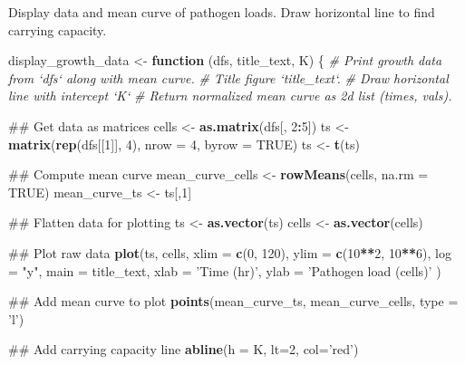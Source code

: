 \documentclass[]{article}
\newenvironment{Shaded}{\begin{snugshade}}{\end{snugshade}}
\newcommand{\KeywordTok}[1]{\textcolor[rgb]{0.13,0.29,0.53}{\textbf{#1}}}
\newcommand{\DataTypeTok}[1]{\textcolor[rgb]{0.13,0.29,0.53}{#1}}
\newcommand{\DecValTok}[1]{\textcolor[rgb]{0.00,0.00,0.81}{#1}}
\newcommand{\StringTok}[1]{\textcolor[rgb]{0.31,0.60,0.02}{#1}}
\newcommand{\CommentTok}[1]{\textcolor[rgb]{0.56,0.35,0.01}{\textit{#1}}}
\newcommand{\OtherTok}[1]{\textcolor[rgb]{0.56,0.35,0.01}{#1}}
\newcommand{\ControlFlowTok}[1]{\textcolor[rgb]{0.13,0.29,0.53}{\textbf{#1}}}
\newcommand{\OperatorTok}[1]{\textcolor[rgb]{0.81,0.36,0.00}{\textbf{#1}}}
\newcommand{\NormalTok}[1]{#1}
\begin{document}
Display data and mean curve of pathogen loads. Draw horizontal line to
find carrying capacity.

\begin{Shaded}
\begin{Highlighting}[]
\NormalTok{display_growth_data <-}\StringTok{ }\ControlFlowTok{function}\NormalTok{ (dfs, title_text, K) \{}
  \CommentTok{# Print growth data from `dfs` along with mean curve.}
  \CommentTok{# Title figure `title_text`.}
  \CommentTok{# Draw horizontal line with intercept `K`}
  \CommentTok{# Return normalized mean curve as 2d list (times, vals).}
  
\NormalTok{  ## Get data as matrices}
\NormalTok{  cells <-}\StringTok{ }\KeywordTok{as.matrix}\NormalTok{(dfs[, }\DecValTok{2}\OperatorTok{:}\DecValTok{5}\NormalTok{])}
\NormalTok{  ts <-}\StringTok{ }\KeywordTok{matrix}\NormalTok{(}\KeywordTok{rep}\NormalTok{(dfs[[}\DecValTok{1}\NormalTok{]], }\DecValTok{4}\NormalTok{), }\DataTypeTok{nrow =} \DecValTok{4}\NormalTok{, }\DataTypeTok{byrow =} \OtherTok{TRUE}\NormalTok{)}
\NormalTok{  ts <-}\StringTok{ }\KeywordTok{t}\NormalTok{(ts)}

\NormalTok{  ## Compute mean curve}
\NormalTok{  mean_curve_cells <-}\StringTok{ }\KeywordTok{rowMeans}\NormalTok{(cells, }\DataTypeTok{na.rm =} \OtherTok{TRUE}\NormalTok{) }
\NormalTok{  mean_curve_ts <-}\StringTok{ }\NormalTok{ts[,}\DecValTok{1}\NormalTok{]}
  
\NormalTok{  ## Flatten data for plotting}
\NormalTok{  ts <-}\StringTok{ }\KeywordTok{as.vector}\NormalTok{(ts)}
\NormalTok{  cells <-}\StringTok{ }\KeywordTok{as.vector}\NormalTok{(cells)}
  
\NormalTok{  ## Plot raw data}
  \KeywordTok{plot}\NormalTok{(ts, cells, }
       \DataTypeTok{xlim =} \KeywordTok{c}\NormalTok{(}\DecValTok{0}\NormalTok{, }\DecValTok{120}\NormalTok{), }
       \DataTypeTok{ylim =} \KeywordTok{c}\NormalTok{(}\DecValTok{10}\OperatorTok{**}\DecValTok{2}\NormalTok{, }\DecValTok{10}\OperatorTok{**}\DecValTok{6}\NormalTok{), }
       \DataTypeTok{log =} \StringTok{"y"}\NormalTok{, }
       \DataTypeTok{main =}\NormalTok{ title_text,}
       \DataTypeTok{xlab =} \StringTok{'Time (hr)'}\NormalTok{,}
       \DataTypeTok{ylab =} \StringTok{'Pathogen load (cells)'}
\NormalTok{       )}
  
\NormalTok{  ## Add mean curve to plot}
  \KeywordTok{points}\NormalTok{(mean_curve_ts, mean_curve_cells, }\DataTypeTok{type =} \StringTok{'l'}\NormalTok{)}
  
\NormalTok{  ## Add carrying capacity line}
  \KeywordTok{abline}\NormalTok{(}\DataTypeTok{h =}\NormalTok{ K, }\DataTypeTok{lt=}\DecValTok{2}\NormalTok{, }\DataTypeTok{col=}\StringTok{'red'}\NormalTok{)}
  

\end{Highlighting}
\end{Shaded}
\end{document}
